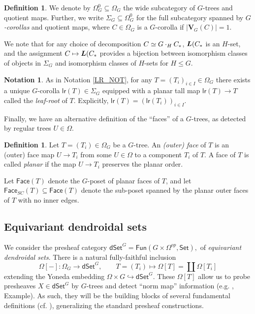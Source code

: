 \documentclass[a4paper,10pt
,draft
]{article}%
\numberwithin{equation}{section}
\numberwithin{figure}{section}
\theoremstyle{definition} %
\newtheorem{definition}[equation]{Definition}%
\newtheorem{notation}[equation]{Notation}%
\newcommand{\longto}{\longrightarrow}%
\newcommand{\into}{\hookrightarrow}%
\newcommand{\Set}{\ensuremath{\mathsf{Set}}}
\newcommand{\dSet}{\mathsf{dSet}}
\newcommand{\Fun}{\mathsf{Fun}}
\newcommand{\1}{\ensuremath{\mathbbm 1}}%
\begin{document}
\begin{definition}
      We denote by $\Omega_G^0 \subseteq \Omega_G$ the wide subcategory of $G$-trees and quotient maps.
      Further, we write $\Sigma_G \subseteq \Omega_G^0$ for the full subcategory spanned by \textit{$G$-corollas} and quotient maps,
      where $C \in \Omega_G$ is a $G$-corolla if $|\boldsymbol{V}_G(C)| = 1$.

      We note that for any choice of decomposition $C \simeq G \cdot_H C_{\**}$, $\boldsymbol{L}(C_{\**}$ is an $H$-set,
      and the assignment $C \mapsto \boldsymbol{L}(C_{\**}$ provides a bijection between
      isomorphism classes of objects in $\Sigma_G$ and
      isomorphism classes of $H$-sets for $H \leq G$.
\end{definition}
      
\begin{notation}
      \label{LRG_NOT}
      As in Notation \ref{LR_NOT}, 
      for any $T = (T_i)_{i \in I} \in \Omega_G$ there exists a unique $G$-corolla $\mathsf{lr}(T) \in \Sigma_G$ equipped with a planar tall map $\mathsf{lr}(T) \to T$
      called the \textit{leaf-root} of $T$.
      Explicitly, $\mathsf{lr}(T) = (\mathsf{lr}(T_i))_{i \in I}$.
\end{notation}

Finally, we have an alternative definition of the ``faces'' of a $G$-trees, as detected by regular trees $U \in \Omega$.
\begin{definition}
      Let $T = (T_i) \in \Omega_G$ be a $G$-tree.
      An \textit{(outer) face} of $T$ is an (outer) face map $U \to T_i$ from some $U \in \Omega$ to a component $T_i$ of $T$.
      A face of $T$ is called \textit{planar} if the map $U \to T_i$ preserves the planar order.

      Let $\mathsf{Face}(T)$ denote the $G$-poset of planar faces of $T$,
      and let $\mathsf{Face}_{SC}(T) \subseteq \mathsf{Face}(T)$ denote the sub-poset spanned by the planar outer faces of $T$ with no inner edges.
\end{definition}



\subsection{Equivariant dendroidal sets}
\label{EDS_SEC}

We consider the presheaf category 
$
\dSet^G = \Fun(G \times \Omega^{op}, \Set),
$
of \textit{equivariant dendroidal sets}.
There is a natural fully-faithful inclusion
\[
      \Omega[-] \colon \Omega_G \longto \dSet^G,
      \qquad
      T = (T_i) \longmapsto \Omega[T] = \coprod \Omega[T_i]
\]
extending the Yoneda embedding $\Omega \times G \into \dSet^G$.
These $\Omega[T]$ allow us to probe presheaves $X \in \dSet^G$ by $G$-trees and detect ``norm map'' information 
(e.g. \cite[Example 4.9]{Per18}, {\color{blue} Example}).
As such, they will be the building blocks of several fundamental definitions (cf. \cite[\S 6]{Per18}), generalizing the standard presheaf constructions.
\end{document}
